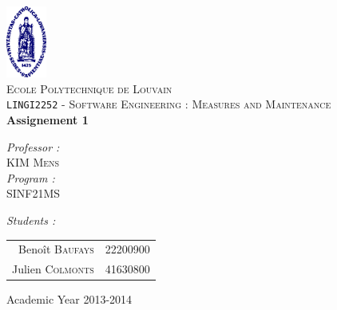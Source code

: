\begin{titlepage}
 
\begin{center}
 
\vspace*{-2cm}\includegraphics[width=0.10\textwidth]{ucl.png}\\[1cm]
 
\textsc{\LARGE Ecole Polytechnique de Louvain}\\[1.5cm]
 
\textsc{\Large \texttt{LINGI2252} - Software Engineering : Measures and Maintenance }\\[0.5cm]
 
 
\vspace{1.0cm}
{ \huge \bfseries Assignement 1\vspace{0.8cm}\\}
 
\vspace{1.0cm}
 
\begin{minipage}{0.4\textwidth}
\begin{flushleft} \large
\emph{Professor :}\\
	KIM \textsc{Mens}\\
\vspace{1cm}
\emph{Program :}\\
	SINF21MS
\end{flushleft}
\end{minipage}
\begin{minipage}{0.4\textwidth}
\begin{flushright} \large
\emph{Students :} \\
\begin{tabular}{rl}
	Benoît \textsc{Baufays}		& {\footnotesize 22200900}\\
	Julien \textsc{Colmonts}	& {\footnotesize 41630800}\\

\end{tabular}
\end{flushright}
\end{minipage}
 
\vfill
 
\vspace{1.1cm}
{\large Academic Year 2013-2014}
\vspace{-1cm} 
\end{center}
 
\end{titlepage}
